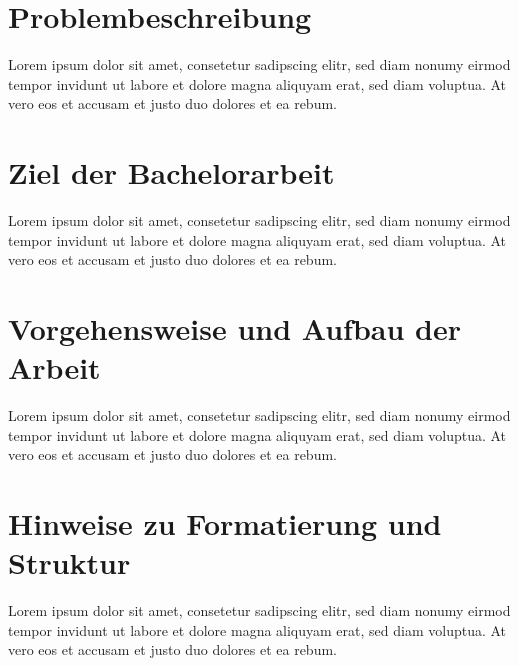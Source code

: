 \documentclass[
							a4paper, 
							11pt, 
							openany, 
							liststotoc,
							parskip=half, 
   							headings=normal
						]{scrreprt}
\begin{document}
\section{Problembeschreibung} \label{se:einleitung_problem}
Lorem ipsum dolor sit amet, consetetur sadipscing elitr, sed diam nonumy eirmod tempor invidunt ut labore et dolore magna aliquyam erat, sed diam voluptua. At vero eos et accusam et justo duo dolores et ea rebum.
\clearpage

\section{Ziel der Bachelorarbeit} \label{se:einleitung_ziel}
Lorem ipsum dolor sit amet, consetetur sadipscing elitr, sed diam nonumy eirmod tempor invidunt ut labore et dolore magna aliquyam erat, sed diam voluptua. At vero eos et accusam et justo duo dolores et ea rebum.
\clearpage

\section{Vorgehensweise und Aufbau der Arbeit} \label{se:einleitung_aufbau}
Lorem ipsum dolor sit amet, consetetur sadipscing elitr, sed diam nonumy eirmod tempor invidunt ut labore et dolore magna aliquyam erat, sed diam voluptua. At vero eos et accusam et justo duo dolores et ea rebum.
\clearpage

\section{Hinweise zu Formatierung und Struktur} \label{se:einleitung_struktur}
Lorem ipsum dolor sit amet, consetetur sadipscing elitr, sed diam nonumy eirmod tempor invidunt ut labore et dolore magna aliquyam erat, sed diam voluptua. At vero eos et accusam et justo duo dolores et ea rebum.
\clearpage



\end{document}
